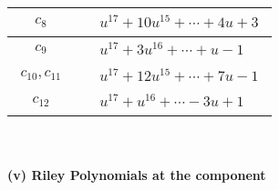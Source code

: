 \documentclass[1p]{elsarticle_modified}
\theoremstyle{definition}
\begin{document}
\begin{tabular}{m{50pt}|m{274pt}}
\hline $$\begin{aligned}c_{8}\end{aligned}$$&$\begin{aligned}
&u^{17}+10 u^{15}+\cdots+4 u+3
\end{aligned}$\\
\hline $$\begin{aligned}c_{9}\end{aligned}$$&$\begin{aligned}
&u^{17}+3 u^{16}+\cdots+u-1
\end{aligned}$\\
\hline $$\begin{aligned}c_{10},c_{11}\end{aligned}$$&$\begin{aligned}
&u^{17}+12 u^{15}+\cdots+7 u-1
\end{aligned}$\\
\hline $$\begin{aligned}c_{12}\end{aligned}$$&$\begin{aligned}
&u^{17}+u^{16}+\cdots-3 u+1
\end{aligned}$\\
\hline
\end{tabular}\\~\\
\newpage\renewcommand{\arraystretch}{1}
\flushleft \textbf{(v) Riley Polynomials at the component}\newline \\
\end{document}
